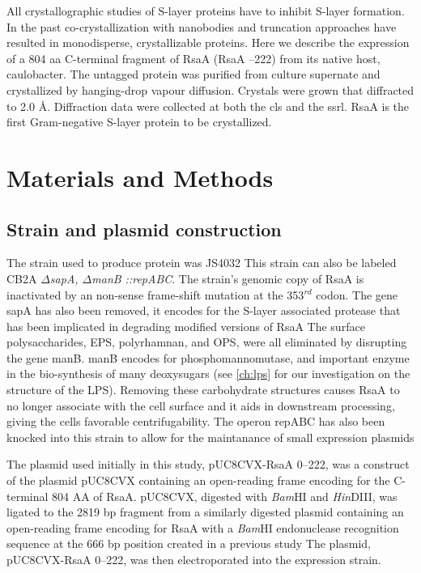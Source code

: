 All crystallographic studies of \ac{S-layer} proteins have to inhibit \ac{S-layer} formation. In the
past co-crystallization with nanobodies
 and truncation
 approaches have resulted in monodisperse, crystallizable proteins. Here we describe the
expression of a 804 \ac{aa} C-terminal fragment of RsaA (RsaA --222) from
its native host, \ac{caulobacter}. The untagged protein was purified
from culture supernate and crystallized by hanging-drop vapour
diffusion. Crystals were grown that diffracted to 2.0 \AA.
Diffraction data were collected at both the \ac{cls} 
and the \ac{ssrl}. RsaA is the first Gram-negative \ac{S-layer} protein to be crystallized.

\section{Materials and Methods}
\label{sec:crystal-materials-and-methods}

\subsection{Strain and plasmid construction}\label{sec:stra-plasm-constr}

The strain used to produce protein was JS4032 
This strain can also be labeled \caulobacter{} CB2A \textit{$\Delta$sapA, $\Delta$manB ::repABC}. The strain's genomic copy of RsaA is inactivated by an non-sense frame-shift mutation at the 353$^{rd}$ codon. The gene sapA has also been removed, it encodes for the S-layer associated protease that has been implicated in degrading modified versions of RsaA The surface polysaccharides, \ac{EPS}, polyrhamnan, and \ac{OPS}, were all eliminated by disrupting the gene manB. manB encodes for phosphomannomutase, and important enzyme in the bio-synthesis of many deoxysugars (see \cref{ch:lps} for our investigation on the structure of the \ac{LPS}). Removing these carbohydrate structures causes RsaA to no longer associate with the cell surface and it aids in downstream processing, giving the cells favorable centrifugability. The operon repABC has also been knocked into this strain to allow for the maintanance of small expression plasmids

The plasmid used initially in this study, pUC8CVX-RsaA \del{}0--222, was a construct of the plasmid pUC8CVX containing an open-reading frame encoding for the C-terminal 804 AA of RsaA. pUC8CVX, digested with \textit{Bam}HI and \textit{Hin}DIII, was ligated to the 2819 bp fragment from a similarly digested plasmid containing an open-reading frame encoding for RsaA with a \textit{Bam}HI  endonuclease recognition sequence at the 666 bp position created in a previous study The plasmid, pUC8CVX-RsaA \del{} 0--222, was then electroporated into the expression strain.

